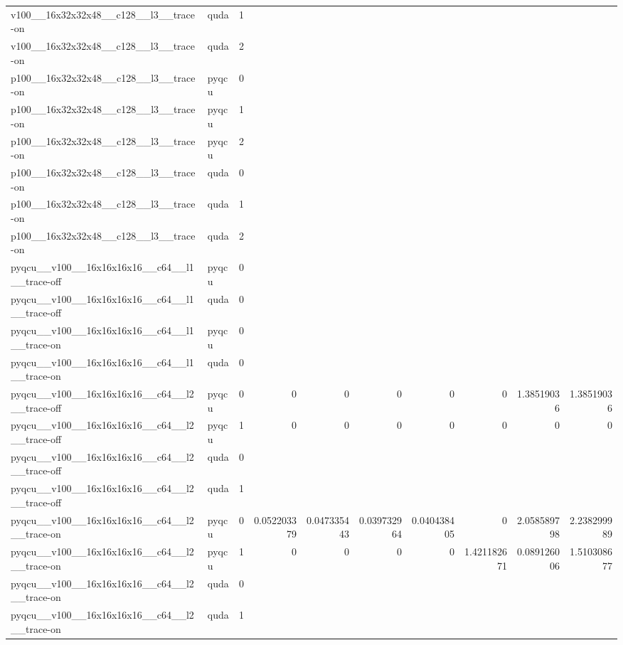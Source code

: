 \begin{table}[htbp]
\begin{tabular}{@{}llrrrrrrrr@{}}
v100\_\_16x32x32x48\_\_c128\_\_l3\_\_trace-on & quda & 1 &  &  &  &  &  &  &  \\
v100\_\_16x32x32x48\_\_c128\_\_l3\_\_trace-on & quda & 2 &  &  &  &  &  &  &  \\
p100\_\_16x32x32x48\_\_c128\_\_l3\_\_trace-on & pyqcu & 0 &  &  &  &  &  &  &  \\
p100\_\_16x32x32x48\_\_c128\_\_l3\_\_trace-on & pyqcu & 1 &  &  &  &  &  &  &  \\
p100\_\_16x32x32x48\_\_c128\_\_l3\_\_trace-on & pyqcu & 2 &  &  &  &  &  &  &  \\
p100\_\_16x32x32x48\_\_c128\_\_l3\_\_trace-on & quda & 0 &  &  &  &  &  &  &  \\
p100\_\_16x32x32x48\_\_c128\_\_l3\_\_trace-on & quda & 1 &  &  &  &  &  &  &  \\
p100\_\_16x32x32x48\_\_c128\_\_l3\_\_trace-on & quda & 2 &  &  &  &  &  &  &  \\
pyqcu\_\_v100\_\_16x16x16x16\_\_c64\_\_l1\_\_trace-off & pyqcu & 0 &  &  &  &  &  &  &  \\
pyqcu\_\_v100\_\_16x16x16x16\_\_c64\_\_l1\_\_trace-off & quda & 0 &  &  &  &  &  &  &  \\
pyqcu\_\_v100\_\_16x16x16x16\_\_c64\_\_l1\_\_trace-on & pyqcu & 0 &  &  &  &  &  &  &  \\
pyqcu\_\_v100\_\_16x16x16x16\_\_c64\_\_l1\_\_trace-on & quda & 0 &  &  &  &  &  &  &  \\
pyqcu\_\_v100\_\_16x16x16x16\_\_c64\_\_l2\_\_trace-off & pyqcu & 0 & 0 & 0 & 0 & 0 & 0 & 1.38519036 & 1.38519036 \\
pyqcu\_\_v100\_\_16x16x16x16\_\_c64\_\_l2\_\_trace-off & pyqcu & 1 & 0 & 0 & 0 & 0 & 0 & 0 & 0 \\
pyqcu\_\_v100\_\_16x16x16x16\_\_c64\_\_l2\_\_trace-off & quda & 0 &  &  &  &  &  &  &  \\
pyqcu\_\_v100\_\_16x16x16x16\_\_c64\_\_l2\_\_trace-off & quda & 1 &  &  &  &  &  &  &  \\
pyqcu\_\_v100\_\_16x16x16x16\_\_c64\_\_l2\_\_trace-on & pyqcu & 0 & 0.052203379 & 0.047335443 & 0.039732964 & 0.040438405 & 0 & 2.058589798 & 2.238299989 \\
pyqcu\_\_v100\_\_16x16x16x16\_\_c64\_\_l2\_\_trace-on & pyqcu & 1 & 0 & 0 & 0 & 0 & 1.421182671 & 0.089126006 & 1.510308677 \\
pyqcu\_\_v100\_\_16x16x16x16\_\_c64\_\_l2\_\_trace-on & quda & 0 &  &  &  &  &  &  &  \\
pyqcu\_\_v100\_\_16x16x16x16\_\_c64\_\_l2\_\_trace-on & quda & 1 &  &  &  &  &  &  &  \\

\end{tabular}
\end{table}
